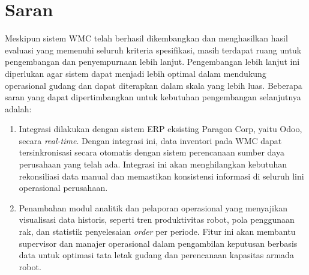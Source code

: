 \section{Saran}
Meskipun sistem WMC telah berhasil dikembangkan dan menghasilkan hasil evaluasi yang memenuhi seluruh kriteria spesifikasi, masih terdapat ruang untuk pengembangan dan penyempurnaan lebih lanjut. Pengembangan lebih lanjut ini diperlukan agar sistem dapat menjadi lebih optimal dalam mendukung operasional gudang dan dapat diterapkan dalam skala yang lebih luas. Beberapa saran yang dapat dipertimbangkan untuk kebutuhan pengembangan selanjutnya adalah:
\begin{enumerate}
\item Integrasi dilakukan dengan sistem ERP eksisting Paragon Corp, yaitu Odoo, secara \textit{real-time}. Dengan integrasi ini, data inventori pada WMC dapat tersinkronisasi secara otomatis dengan sistem perencanaan sumber daya perusahaan yang telah ada. Integrasi ini akan menghilangkan kebutuhan rekonsiliasi data manual dan memastikan konsistensi informasi di seluruh lini operasional perusahaan.
\item Penambahan modul analitik dan pelaporan operasional yang menyajikan visualisasi data historis, seperti tren produktivitas robot, pola penggunaan rak, dan statistik penyelesaian \textit{order} per periode. Fitur ini akan membantu supervisor dan manajer operasional dalam pengambilan keputusan berbasis data untuk optimasi tata letak gudang dan perencanaan kapasitas armada robot.
\end{enumerate}
